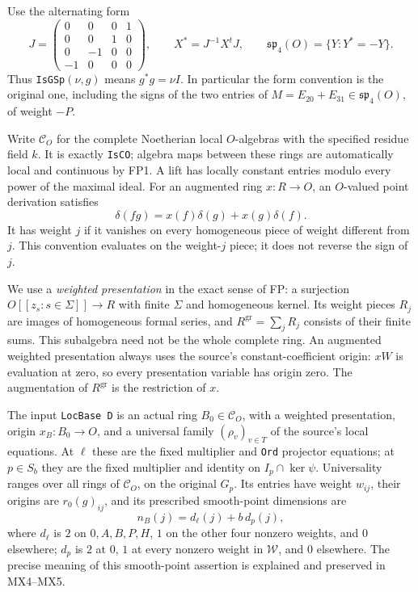 Use the alternating form
\[
 J=\begin{pmatrix}0&0&0&1\\0&0&1&0\\0&-1&0&0\\-1&0&0&0\end{pmatrix},
 \qquad X^*=J^{-1}X^tJ,
 \qquad \mathfrak {sp}_4(O)=\{Y:Y^*=-Y\}.
 \tag{MX.3}
\]
Thus \texttt{IsGSp}$(\nu,g)$ means $g^*g=\nu I$.
In particular the form convention is the original one, including
the signs of the two entries of
$M=E_{20}+E_{31}\in\mathfrak {sp}_4(O)$, of weight $-P$.

Write $\mathcal C_O$ for the complete Noetherian local
$O$-algebras with the specified residue field $k$.
It is exactly \texttt{IsCO}; algebra maps between these rings are
automatically local and continuous by FP1.  A lift has locally
constant entries modulo every power of the maximal ideal.
For an augmented ring $x:R\to O$, an $O$-valued point derivation
satisfies
\[
 \delta(fg)=x(f)\delta(g)+x(g)\delta(f).
 \tag{MX.4}
\]
It has weight $j$ if it vanishes on every homogeneous piece of
weight different from $j$.  This convention evaluates on the
weight-$j$ piece; it does not reverse the sign of $j$.

We use a \emph{weighted presentation} in the exact sense of FP:
a surjection $O[[z_s:s\in\Sigma]]\to R$ with finite $\Sigma$
and homogeneous kernel.  Its weight pieces $R_j$ are images of
homogeneous formal series, and $R^{\mathrm{gr}}=\sum_jR_j$ consists
of their finite sums.  This subalgebra need not be the whole
complete ring.  An augmented weighted presentation always uses
the source's constant-coefficient origin: $xW$ is evaluation
at zero, so every presentation variable has origin zero.
The augmentation of $R^{\mathrm{gr}}$ is the restriction of $x$.

The input \texttt{LocBase D} is an actual ring
$B_0\in\mathcal C_O$, with a weighted presentation, origin
$x_B:B_0\to O$, and a universal family $(\rho_v)_{v\in T}$
of the source's local equations.  At $\ell$ these are the
fixed multiplier and \texttt{Ord} projector equations; at
$p\in S_b$ they are the fixed multiplier and identity on
$I_p\cap\ker\psi$.  Universality ranges over all rings of
$\mathcal C_O$, on the original $G_p$.
Its entries have weight $w_{ij}$, their origins are
$r_0(g)_{ij}$, and its prescribed smooth-point dimensions are
\[
 n_B(j)=d_\ell(j)+b\,d_p(j),
 \tag{MX.5}
\]
where $d_\ell$ is $2$ on $0,A,B,P,H$, $1$ on the other
four nonzero weights, and $0$ elsewhere; $d_p$ is $2$ at $0$,
$1$ at every nonzero weight in $\mathcal W$, and $0$ elsewhere.
The precise meaning of this smooth-point assertion is explained
and preserved in MX4--MX5.

